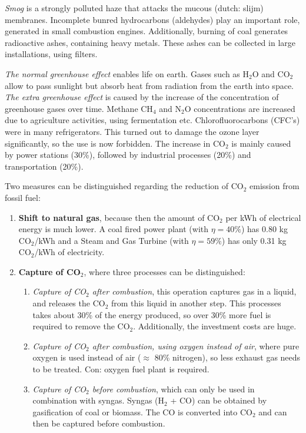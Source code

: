 \documentclass[a4paper,10pt]{article}
\begin{document}
\emph{Smog} is a strongly polluted haze that attacks the mucous (dutch: slijm) membranes. Incomplete bunred hydrocarbons (aldehydes) play an important role, generated in small combustion engines. Additionally, burning of coal generates radioactive ashes, containing heavy metals. These ashes can be collected in large installations, using filters.

\emph{The normal greenhouse effect} enables life on earth. Gases such as H$_2$O and CO$_2$ allow to pass sunlight but absorb heat from radiation from the earth into space. \\
\emph{The extra greenhouse effect} is caused by the increase of the concentration of greenhouse gases over time. Methane CH$_4$ and N$_2$O concentrations are increased due to agriculture activities, using fermentation etc. Chlorofluorocarbons (CFC's) were in many refrigerators. This turned out to damage the ozone layer significantly, so the use is now forbidden. The increase in CO$_2$ is mainly caused by power stations (30\%), followed by industrial processes (20\%) and transportation (20\%). \bigskip

Two measures can be distinguished regarding the reduction of CO$_2$ emission from fossil fuel:
\begin{enumerate}
 \item \textbf{Shift to natural gas}, because then the amount of CO$_2$ per kWh of electrical energy is much lower. A coal fired power plant (with $\eta = 40 \%$) has 0.80 kg CO$_2$/kWh and a Steam and Gas Turbine (with $\eta = 59 \%$) has only 0.31 kg CO$_2$/kWh of electricity.
 \item \textbf{Capture of CO$_2$}, where three processes can be distinguished:
 \begin{enumerate}
  \item \emph{Capture of CO$_2$ after combustion}, this operation captures gas in a liquid, and releases the CO$_2$ from this liquid in another step. This processes takes about 30\% of the energy produced, so over 30\% more fuel is required to remove the CO$_2$. Additionally, the investment costs are huge.
  \item \emph{Capture of CO$_2$ after combustion, using oxygen instead of air}, where pure oxygen is used instead of air ($\approx$ 80\% nitrogen), so less exhaust gas needs to be treated. Con: oxygen fuel plant is required.
  \item \emph{Capture of CO$_2$ before combustion}, which can only be used in combination with syngas. Syngas (H$_2$ + CO) can be obtained by gasification of coal or biomass. The CO is converted into CO$_2$ and can then be captured before combustion.
 \end{enumerate}
\end{enumerate}
\end{document}
